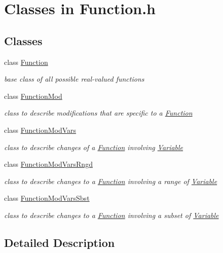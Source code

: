 \hypertarget{group___function___c_l_a_s_s_e_s}{}\section{Classes in Function.\+h}
\label{group___function___c_l_a_s_s_e_s}
\subsection*{Classes}
\begin{DoxyCompactItemize}
\item 
class \mbox{\hyperlink{class_s_m_spp__di__unipi__it_1_1_function}{Function}}
\begin{DoxyCompactList}\small\item\em base class of all possible real-\/valued functions \end{DoxyCompactList}\item 
class \mbox{\hyperlink{class_s_m_spp__di__unipi__it_1_1_function_mod}{Function\+Mod}}
\begin{DoxyCompactList}\small\item\em class to describe modifications that are specific to a \mbox{\hyperlink{class_s_m_spp__di__unipi__it_1_1_function}{Function}} \end{DoxyCompactList}\item 
class \mbox{\hyperlink{class_s_m_spp__di__unipi__it_1_1_function_mod_vars}{Function\+Mod\+Vars}}
\begin{DoxyCompactList}\small\item\em class to describe changes of a \mbox{\hyperlink{class_s_m_spp__di__unipi__it_1_1_function}{Function}} involving \mbox{\hyperlink{class_s_m_spp__di__unipi__it_1_1_variable}{Variable}} \end{DoxyCompactList}\item 
class \mbox{\hyperlink{class_s_m_spp__di__unipi__it_1_1_function_mod_vars_rngd}{Function\+Mod\+Vars\+Rngd}}
\begin{DoxyCompactList}\small\item\em class to describe changes to a \mbox{\hyperlink{class_s_m_spp__di__unipi__it_1_1_function}{Function}} involving a range of \mbox{\hyperlink{class_s_m_spp__di__unipi__it_1_1_variable}{Variable}} \end{DoxyCompactList}\item 
class \mbox{\hyperlink{class_s_m_spp__di__unipi__it_1_1_function_mod_vars_sbst}{Function\+Mod\+Vars\+Sbst}}
\begin{DoxyCompactList}\small\item\em class to describe changes to a \mbox{\hyperlink{class_s_m_spp__di__unipi__it_1_1_function}{Function}} involving a subset of \mbox{\hyperlink{class_s_m_spp__di__unipi__it_1_1_variable}{Variable}} \end{DoxyCompactList}\end{DoxyCompactItemize}


\subsection{Detailed Description}
